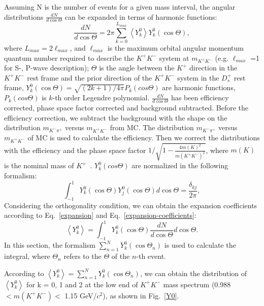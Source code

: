 \documentclass[aps,prd,twocolumn,showpacs,amsmath,amssymb]{revtex4-1}
\begin{document}
Assuming N is the number of events for a given mass interval, the angular distributions $\frac{dN}{d\cos\Theta}$ can be expanded in terms of harmonic functions:
    \begin{equation}
        \frac{dN}{d\cos\Theta} = 2\pi\sum_{k=0}^{L_{max}}\left\langle Y_{k}^{0}\right\rangle Y_{k}^{0}(\cos\Theta),\label{expansion}
    \end{equation}
    where $L_{max} = 2 \ell_{max}$, and $\ell_{max}$ is the maximum orbital angular momentum quantum number required to describe the $K^{+}K^{-}$ system at $m_{K^{+}K^{-}}$ (e.g. $\ell_{max}$ =1 for S-, P-wave description); $\Theta$ is the angle between the $K^{+}$ direction in the $K^{+}K^{-}$ rest frame and the prior direction of the $K^{+}K^{-}$ system in the $D_{s}^{+}$ rest frame, $Y_{k}^{0}(\cos\Theta) = \sqrt{(2k+1)/4\pi}P_{k}(cos\Theta)$ are harmonic functions, $P_{k}(cos\Theta)$ is $k$-th order Legendre polynomial.
    $\frac{dN}{d\cos\Theta}$ has been efficiency corrected, phase space factor corrected and background subtracted.
    Before the efficiency correction, we subtract the background with the shape on the distribution $m_{K^{-}\pi^{+}}$ versus $m_{K^{+}K^{-}}$ from MC. 
    The distribution $m_{K^{-}\pi^{+}}$ versus $m_{K^{+}K^{-}}$ of MC is used to calculate the efficiency.
    Then we correct the distributions with the efficiency and the phase space factor $1/\sqrt{ 1 - \frac{4m(K)^{2}}{m(K^{+}K^{-})^{2}}}$, where $m(K)$ is the nominal mass of $K^{+}$~\cite{PDG}.
    $Y_{k}^{0}(cos\Theta)$ are normalized in the following formalism:
    \begin{equation}
        \int_{-1}^{1}Y_{k}^{0}(\cos\Theta)Y_{j}^{0}(\cos\Theta) d\cos\Theta  = \frac{\delta_{kj}}{2\pi},\label{sh-normalizations}
    \end{equation}
    Considering the orthogonality condition, we can obtain the expansion coefficients according to Eq.~\ref{expansion} and Eq.~\ref{expansion-coefficients}:
    \begin{equation}
        \left\langle Y_{k}^{0} \right\rangle = \int_{-1}^{1}Y_{k}^{0}(\cos\Theta) \frac{dN}{d\cos\Theta} d\cos\Theta. \label{expansion-coefficients}
    \end{equation}
    In this section, the formalism $\sum_{n=1}^{N}Y_{k}^{0}(\cos\Theta_{n})$ is used to calculate the integral, where $\Theta_{n}$ refers to the $\Theta$ of the $n$-th event.

    According to $\left\langle Y_{k}^{0} \right\rangle = \sum_{n=1}^{N}Y_{k}^{0}(\cos\Theta_{n})$, we can obtain the distribution of $\left\langle Y_{k}^{0} \right\rangle$ for k = 0, 1 and 2 at the low end of $K^{+}K^{-}$ mass spectrum (0.988 $< m(K^{+}K^{-}) < $ 1.15 GeV/$c^{2}$), as shown in Fig.~\ref{Y0}.
\end{document}
